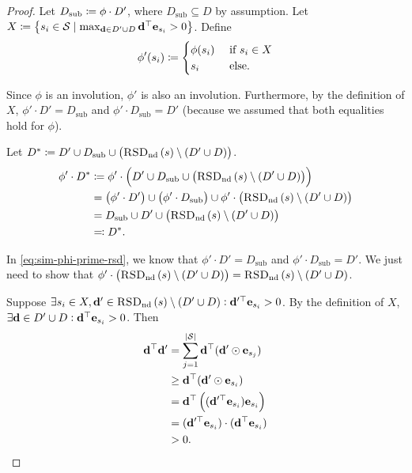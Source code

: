 \rsdIC*
\begin{proof}
Let $D_\text{sub}\defeq\phi\cdot D'$, where $D_\text{sub}\subseteq D$ by assumption. Let $X\defeq \set{s_i\in \St \mid \max_{\dbf \in D'\cup D} \dbf^\top \unitvec[s_i]>0}$. Define
\begin{equation}
    \phi'(s_i)\defeq 
    \begin{cases}
    \phi(s_i) & \text{ if } s_i\in X\label{eq:phi-prime-def}\\
    s_i &\text{ else}.
    \end{cases}
\end{equation}

Since $\phi$ is an involution, $\phi'$ is also an involution. Furthermore, by the definition of $X$, $\phi'\cdot D'=D_\text{sub}$ and $\phi'\cdot D_\text{sub}=D'$ (because we assumed that both equalities hold for $\phi$). 

Let $D^*\defeq D'\cup D_\text{sub} \cup \prn{\RSDnd\setminus (D' \cup D)}$.
\begin{align}
    \phi'\cdot D^*&\defeq \phi'\cdot \prn{D'\cup D_\text{sub} \cup \prn{\RSDnd\setminus (D' \cup D)}} \\
    &=\prn{\phi'\cdot D'}\cup \prn{\phi'\cdot D_\text{sub}} \cup \phi'\cdot\prn{\RSDnd\setminus (D' \cup D)} \\
    &= D_\text{sub} \cup D' \cup \prn{\RSDnd\setminus (D' \cup D)}\label{eq:sim-phi-prime-rsd}\\
    &\eqdef D^*.\label{eq:fixing-rsd-perm}
\end{align}

In \cref{eq:sim-phi-prime-rsd}, we know that $\phi'\cdot D'=D_\text{sub}$ and $\phi'\cdot D_\text{sub}=D'$. We just need to show that $\phi'\cdot \prn{\RSDnd\setminus (D' \cup D)}=\RSDnd\setminus (D' \cup D)$. 

Suppose $\exists s_i\in X, \dbf' \in \RSDnd\setminus (D' \cup D):\dbf'^\top \unitvec[s_i]>0$. By the definition of $X$, $\exists \dbf \in D' \cup D:\dbf^\top \unitvec[s_i]>0$. Then 
\begin{align}
    \dbf^\top \dbf'&=\sum_{j=1}^{\abs{\St}} \dbf^\top (\dbf'\odot\unitvec[s_j])\label{eq:dot-had}\\
    &\geq \dbf^\top (\dbf'\odot\unitvec[s_i])\label{eq:non-neg-rsd-entry}\\
    &=\dbf^\top \prn{(\dbf'^\top \unitvec[s_i])\unitvec[s_i]}\\
    &= (\dbf'^\top \unitvec[s_i]) \cdot (\dbf^\top\unitvec[s_i])\\
    &>0.\label{eq:pos-rsd-agree}
\end{align}


\end{proof}
